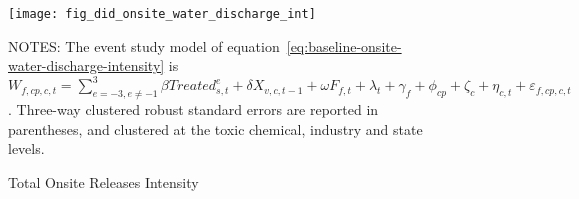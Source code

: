 \begin{figure}[H]
    \centering
    \texttt{[image: fig\_did\_onsite\_water\_discharge\_int]}
    \caption{Total Onsite Releases Intensity}
    \label{fig:baseline-onsite-water-discharge-intensity}
    \begin{minipage}{18cm}
        \vspace{0.05in}
        NOTES: The event study model of equation~\ref{eq:baseline-onsite-water-discharge-intensity} is $W_{f,cp,c,t} = \sum_{{e = -3},{e \neq -1}}^{3} \beta Treated_{s,t}^e + \delta X_{v,c,t-1} + \omega F_{f,t} + \lambda_{t} + \gamma_{f} + \phi_{cp} + \zeta_{c} + \eta_{c,t} + \varepsilon_{f,cp,c,t}$. Three-way clustered robust standard errors are reported in parentheses, and clustered at the toxic chemical, industry and state levels.
    \end{minipage}
\end{figure}